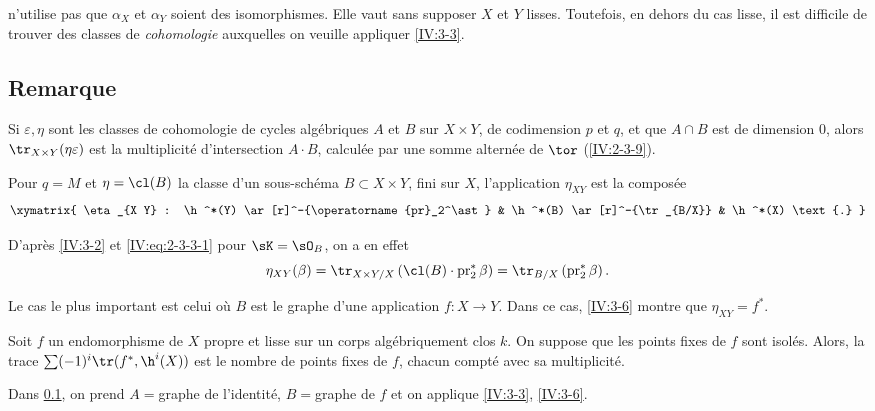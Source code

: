  n'utilise pas que $\alpha_X$ et $\alpha_Y$ soient des 
isomorphismes. Elle vaut sans supposer $X$ et $Y$ lisses. Toutefois, en dehors 
du cas lisse, il est difficile de trouver des classes de \emph{cohomologie} 
auxquelles on veuille appliquer \ref{IV:3-3}. 





\subsection{Remarque}\label{IV:3-5}

Si $\varepsilon,\eta$ sont les classes de cohomologie de cycles algébriques 
$A$ et $B$ sur $X\times Y$, de codimension $p$ et $q$, et que $A\cap B$ est de 
dimension $0$, alors $\tr_{X\times Y}(\eta\varepsilon)$ est la multiplicité 
d'intersection $A\cdot B$, calculée par une somme alternée de $\tor$ 
(\ref{IV:2-3-9}). 





\begin{proposition_}\label{IV:3-6}
Pour $q=M$ et $\eta=\cl(B)$ la classe d'un sous-schéma $B\subset X\times Y$, 
fini sur $X$, l'application $\eta_{X Y}$ est la composée 
\[\xymatrix{
  \eta_{X Y} : \h^*(Y) \ar[r]^-{\operatorname{pr}_2^\ast} 
    & \h^*(B) \ar[r]^-{\tr_{B/X}} 
    & \h^*(X) \text{.}
}\]
\end{proposition_}

D'après \ref{IV:3-2} et \eqref{IV:eq:2-3-3-1} pour $\sK=\sO_B$, on a en 
effet 
\[
  \eta_{X Y}(\beta) = \tr_{X\times Y/X}\left(\cl(B)\cdot \operatorname{pr}_2^\ast\beta\right) = \tr_{B/X}\left(\operatorname{pr}_2^\ast \beta\right) \text{.}
\]

Le cas le plus important est celui où $B$ est le graphe d'une application 
$f:X\to Y$. Dans ce cas, \ref{IV:3-6} montre que $\eta_{X Y}=f^\ast$. 





\begin{corollary_}\label{IV:3-7}
Soit $f$ un endomorphisme de $X$ propre et lisse sur un corps algébriquement 
clos $k$. On suppose que les points fixes de $f$ sont isolés. Alors, la 
trace $\sum (-1)^i \tr(f^\ast,\h^i(X))$ est le nombre de points fixes de $f$, 
chacun compté avec sa multiplicité.
\end{corollary_}

Dans \ref{IV:3-5}, on prend $A=$graphe de l'identité, $B=$graphe de $f$ et on 
applique \ref{IV:3-3}, \ref{IV:3-6}. 





